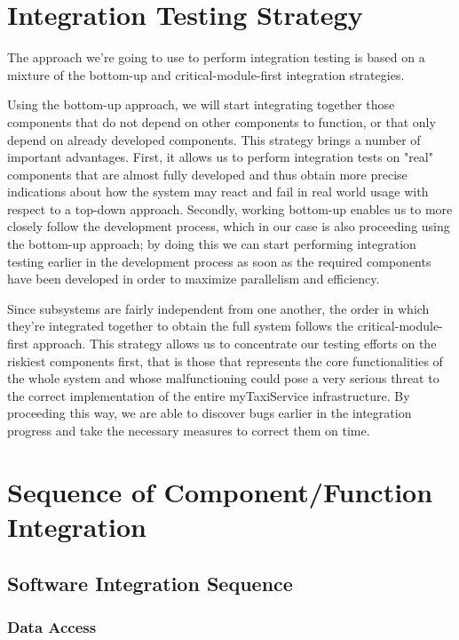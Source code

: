 \section{Integration Testing Strategy}
The approach we're going to use to perform integration testing is based on a mixture of the bottom-up and critical-module-first integration strategies.

Using the bottom-up approach, we will start integrating together those components that do not depend on other components to function, or that only depend on already developed components. This strategy brings a number of important advantages. First, it allows us to perform integration tests on "real" components that are almost fully developed and thus obtain more precise indications about how the system may react and fail in real world usage with respect to a top-down approach. Secondly, working bottom-up enables us to more closely follow the development process, which in our case is also proceeding using the bottom-up approach; by doing this we can start performing integration testing earlier in the development process as soon as the required components have been developed in order to maximize parallelism and efficiency.

Since subsystems are fairly independent from one another, the order in which they're integrated together to obtain the full system follows the critical-module-first approach. This strategy allows us to concentrate our testing efforts on the riskiest components first, that is those that represents the core functionalities of the whole system and whose malfunctioning could pose a very serious threat to the correct implementation of the entire myTaxiService infrastructure. By proceeding this way, we are able to discover bugs earlier in the integration progress and take the necessary measures to correct them on time.
\section{Sequence of Component/Function Integration}
\subsection{Software Integration Sequence}
\subsubsection*{Data Access}
\begin{figure}[H]
\centering
{}
\end{figure}
